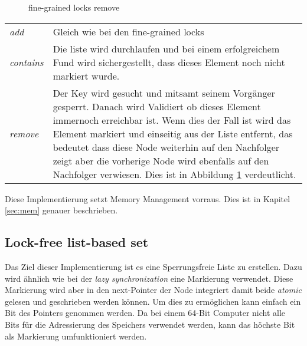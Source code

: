 \begin{figure}[H]
	\centering
	\caption{fine-grained locks remove}
	\label{tik:fine-grained-remove}
\end{figure}

\begin{table}[H]
    \begin{tabularx}{\textwidth}{lX}
        \textit{add} & Gleich wie bei den fine-grained locks\\
        \textit{contains} & Die liste wird durchlaufen und bei einem erfolgreichem Fund wird sichergestellt, dass dieses Element noch nicht markiert wurde. \\
        \textit{remove} & Der Key wird gesucht und mitsamt seinem Vorgänger gesperrt. Danach wird Validiert ob dieses Element immernoch erreichbar ist. Wenn dies der Fall ist wird das Element markiert und einseitig aus der Liste entfernt, das bedeutet dass diese Node weiterhin auf den Nachfolger zeigt aber die vorherige Node wird ebenfalls auf den Nachfolger verwiesen. Dies ist in Abbildung \ref{tik:fine-grained-remove} verdeutlicht. \\
    \end{tabularx}
\end{table}

Diese Implementierung setzt Memory Management vorraus. Dies ist in Kapitel \ref{sec:mem} genauer beschrieben.

\subsection{Lock-free list-based set}

Das Ziel dieser Implementierung ist es eine Sperrungsfreie Liste zu erstellen. Dazu wird ähnlich wie bei der \textit{lazy synchronization} eine Markierung verwendet. Diese Markierung wird aber in den next-Pointer der Node integriert damit beide \textit{atomic} gelesen und geschrieben werden können. Um dies zu ermöglichen kann einfach ein Bit des Pointers genommen werden. Da bei einem 64-Bit Computer nicht alle Bits für die Adressierung des Speichers verwendet werden, kann das höchste Bit als Markierung umfunktioniert werden.

